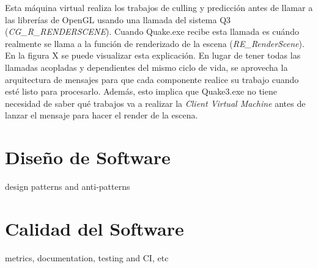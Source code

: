 \documentclass[a4paper,12pt]{report}
\begin{document}
    Esta máquina virtual realiza los trabajos de culling y predicción antes de llamar a las librerías de OpenGL usando una llamada del sistema Q3 (\textit{CG\_R\_RENDERSCENE}). Cuando Quake.exe recibe esta llamada es cuándo realmente se llama a la función de renderizado de la escena (\textit{RE\_RenderScene}).\cite{unrolled_loop_source}\cite{unrolled_loop}\\   
    
    En la figura X se puede visualizar esta explicación. En lugar de tener todas las llamadas acopladas y dependientes del mismo ciclo de vida, se aprovecha la arquitectura de mensajes para que cada componente realice su trabajo cuando esté listo para procesarlo. Además, esto implica que Quake3.exe no tiene necesidad de saber qué trabajos va a realizar la \textit{Client Virtual Machine} antes de lanzar el mensaje para hacer el render de la escena.\\
    
    
    
	
	
	
	\newpage
	\section{Diseño de Software}
	design patterns and anti-patterns\\
	
	\section{Calidad del Software}
	metrics, documentation, testing and CI, etc\\
	
\end{document}
